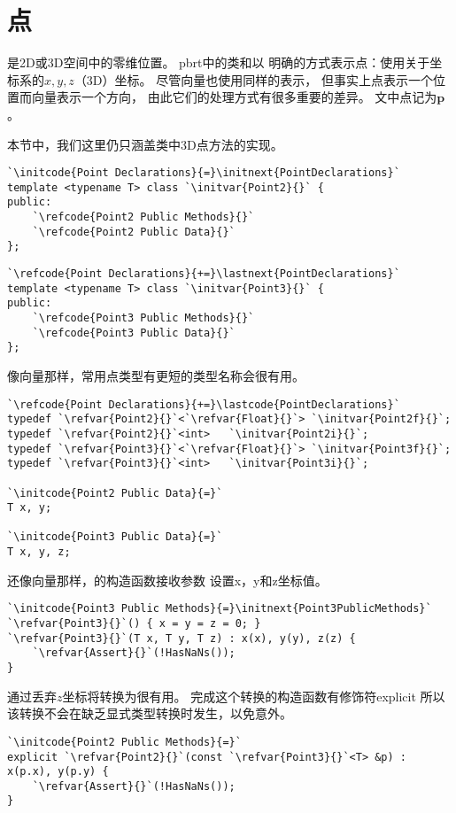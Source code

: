 \section{点}\label{sec:点}

是2D或3D空间中的零维位置。
pbrt中的类和以
明确的方式表示点：使用关于坐标系的$x,y,z$（3D）坐标。
尽管向量也使用同样的表示，
但事实上点表示一个位置而向量表示一个方向，
由此它们的处理方式有很多重要的差异。
文中点记为$\bm p$。

本节中，我们这里仍只涵盖类中3D点方法的实现。
\begin{lstlisting}
`\initcode{Point Declarations}{=}\initnext{PointDeclarations}`
template <typename T> class `\initvar{Point2}{}` {
public:
    `\refcode{Point2 Public Methods}{}`
    `\refcode{Point2 Public Data}{}`
};
\end{lstlisting}

\begin{lstlisting}
`\refcode{Point Declarations}{+=}\lastnext{PointDeclarations}`
template <typename T> class `\initvar{Point3}{}` {
public:
    `\refcode{Point3 Public Methods}{}`
    `\refcode{Point3 Public Data}{}`
};
\end{lstlisting}

像向量那样，常用点类型有更短的类型名称会很有用。
\begin{lstlisting}
`\refcode{Point Declarations}{+=}\lastcode{PointDeclarations}`
typedef `\refvar{Point2}{}`<`\refvar{Float}{}`> `\initvar{Point2f}{}`;
typedef `\refvar{Point2}{}`<int>   `\initvar{Point2i}{}`;
typedef `\refvar{Point3}{}`<`\refvar{Float}{}`> `\initvar{Point3f}{}`;
typedef `\refvar{Point3}{}`<int>   `\initvar{Point3i}{}`;

`\initcode{Point2 Public Data}{=}`
T x, y;

`\initcode{Point3 Public Data}{=}`
T x, y, z;
\end{lstlisting}

还像向量那样，的构造函数接收参数
设置{\ttfamily x}，{\ttfamily y}和{\ttfamily z}坐标值。
\begin{lstlisting}
`\initcode{Point3 Public Methods}{=}\initnext{Point3PublicMethods}`
`\refvar{Point3}{}`() { x = y = z = 0; }
`\refvar{Point3}{}`(T x, T y, T z) : x(x), y(y), z(z) {
    `\refvar{Assert}{}`(!HasNaNs());
}
\end{lstlisting}

通过丢弃$z$坐标将转换为很有用。
完成这个转换的构造函数有修饰符{\ttfamily explicit}
所以该转换不会在缺乏显式类型转换时发生，以免意外。
\begin{lstlisting}
`\initcode{Point2 Public Methods}{=}`
explicit `\refvar{Point2}{}`(const `\refvar{Point3}{}`<T> &p) : x(p.x), y(p.y) {
    `\refvar{Assert}{}`(!HasNaNs());
}
\end{lstlisting}

